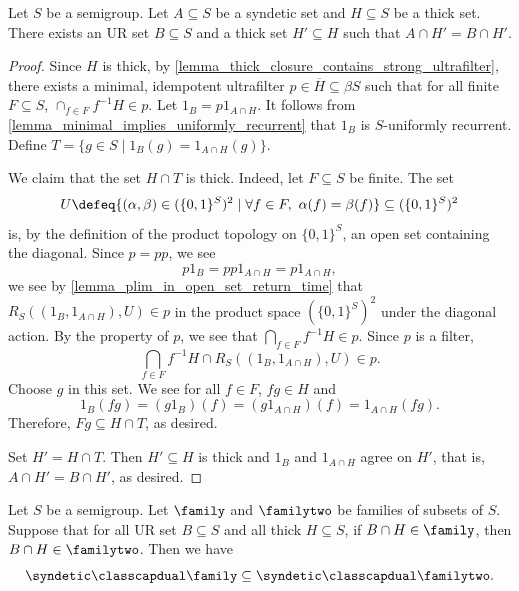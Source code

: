 \begin{lemma}
\label{lem:auslander-ellis}
\leanok{}
Let $S$ be a semigroup.  Let $A \subseteq S$ be a syndetic set and $H \subseteq S$ be a thick set. There exists an UR set $B \subseteq S$ and a thick set $H' \subseteq H$ such that $A \cap H' = B \cap H'$.
\end{lemma}

\begin{proof}
    Since $H$ is thick, by \cref{lemma_thick_closure_contains_strong_ultrafilter}, there exists a minimal, idempotent ultrafilter $p \in \overline{H} \subseteq \beta S$ such that for all finite $F \subseteq S$, $\cap_{f \in F} f^{-1} H \in p$. Let $1_B = p 1_{A \cap H}$.  It follows from \cref{lemma_minimal_implies_uniformly_recurrent} that $1_B$ is $S$-uniformly recurrent.
    Define $T = \{g \in S \mid 1_B(g) = 1_{A \cap H}(g) \}$.
    
    We claim that the set $H \cap T$ is thick.  Indeed, let $F \subseteq S$ be finite. The set
    \[U \defeq \{(\alpha, \beta) \in (\{0,1\}^S)^2 \mid \forall f \in F, \ \alpha(f) = \beta (f)\} \subseteq (\{0,1\}^S)^2\]
    is, by the definition of the product topology on $\{0,1\}^S$, an open set containing the diagonal.  Since $p = pp$, we see
    \[p 1_B = p p 1_{A \cap H} = p 1_{A \cap H},\]
    we see by \cref{lemma_plim_in_open_set_return_time} that $R_S((1_B,1_{A \cap H}), U) \in p$ in the product space $(\{0,1\}^S)^2$ under the diagonal action.  By the property of $p$, we see that $\bigcap_{f \in F} f^{-1} H \in p$.  Since $p$ is a filter,
    \[\bigcap_{f \in F} f^{-1} H \cap R_S((1_B,1_{A \cap H}), U) \in p.\]
    Choose $g$ in this set.  We see for all $f \in F$, $fg \in H$ and
    \[1_B(fg) = (g1_B)(f) = (g1_{A \cap H})(f) = 1_{A \cap H}(fg).\]
    Therefore, $Fg \subseteq H \cap T$, as desired.
    
    Set $H' = H \cap T$.  Then $H' \subseteq H$ is thick and $1_B$ and $1_{A \cap H}$ agree on $H'$, that is, $A \cap H' = B \cap H'$, as desired.
\end{proof}

\begin{theorem}
\label{thm_lspwf_upgrade}
    Let $S$ be a semigroup. Let $\family$ and $\familytwo$ be families of subsets of $S$. Suppose that for all UR set $B \subseteq S$ and all thick $H \subseteq S$, if $B \cap H \in \family$, then $B \cap H \in \familytwo$.  Then we have
    \[\syndetic \classcapdual \family \subseteq \syndetic \classcapdual \familytwo.\]
\end{theorem}

